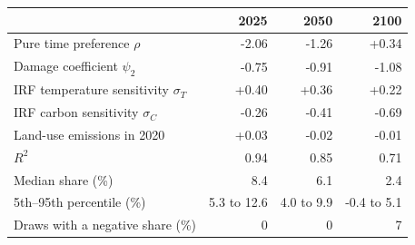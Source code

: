 \begin{tabular}{lrrr}
\toprule
 & 2025 & 2050 & 2100 \\
\midrule
Pure time preference $\rho$ & -2.06 & -1.26 & +0.34 \\
Damage coefficient $\psi_2$ & -0.75 & -0.91 & -1.08 \\
IRF temperature sensitivity $\sigma_T$ & +0.40 & +0.36 & +0.22 \\
IRF carbon sensitivity $\sigma_C$ & -0.26 & -0.41 & -0.69 \\
Land-use emissions in 2020 & +0.03 & -0.02 & -0.01 \\
\midrule
$R^2$ & 0.94 & 0.85 & 0.71 \\
Median share (\%) & 8.4 & 6.1 & 2.4 \\
5th--95th percentile (\%) & 5.3 to 12.6 & 4.0 to 9.9 & -0.4 to 5.1 \\
Draws with a negative share (\%) & 0 & 0 & 7 \\
\bottomrule
\end{tabular}
